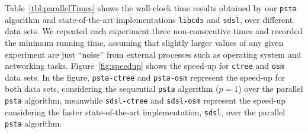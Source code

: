 Table~\ref{tbl:parallelTimes} shows the wall-clock time results obtained by
our {\tt psta} algorithm and state-of-the-art implementations {\tt libcds} and {\tt sdsl}, over different data sets.
We repeated each experiment three non-consecutive times and recorded the minimum
running time, assuming that slightly larger values of any given
experiment are just ``noise'' from external processes such as
operating system and networking tasks.
Figure~\ref{fig:speedup} shows the speed-up for {\tt ctree} and {\tt osm} data sets. In the figure,
{\tt psta-ctree} and {\tt psta-osm} represent the speed-up for both data sets, considering the sequential
{\tt psta} algorithm ($p=1$) over the parallel {\tt psta} algorithm, meanwhile {\tt sdsl-ctree} and {\tt sdsl-osm}
represent the speed-up considering the faster state-of-the-art implementation, {\tt sdsl}, over the parallel {\tt psta} algorithm.

